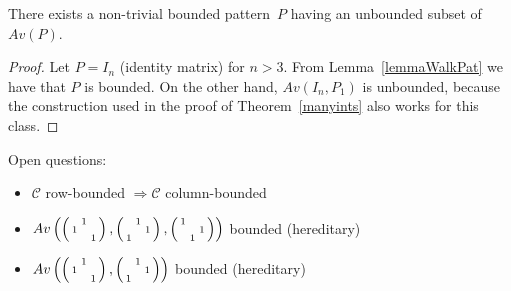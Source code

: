 \begin{obs}
There exists a non-trivial bounded pattern~$P$ having an unbounded subset of $Av(P)$.
\end{obs}
\begin{proof}
Let $P=I_n$ (identity matrix) for $n>3$. From Lemma~\ref{lemmaWalkPat} we have that $P$ is bounded. On the other hand, $Av(I_n,P_1)$ is unbounded, because the construction used in the proof of Theorem~\ref{manyints} also works for this class.
\end{proof}

Open questions:
\begin{itemize}
	\item $\mathcal{C}$ row-bounded $\Rightarrow\mathcal{C}$ column-bounded
	\item $Av\left(\left(\begin{smallmatrix} &1& \\1& & \\ & &1\end{smallmatrix}\right),\left(\begin{smallmatrix} &1& \\ & &1\\1& & \end{smallmatrix}\right),\left(\begin{smallmatrix}1& & \\ & &1\\ &1& \end{smallmatrix}\right)\right)$ bounded (hereditary)
	\item $Av\left(\left(\begin{smallmatrix} &1& \\1& & \\ & &1\end{smallmatrix}\right),\left(\begin{smallmatrix} &1& \\ & &1\\1& & \end{smallmatrix}\right)\right)$ bounded (hereditary)
\end{itemize}